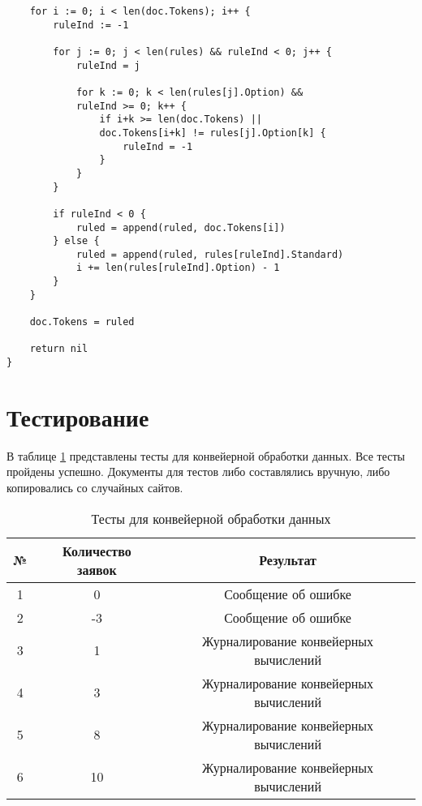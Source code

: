 \begin{code}
\caption{Листинг функции применения правил к токенам (окончание листинга \ref{code:rule1})}
\label{code:rule2}
\begin{verbatim}
	for i := 0; i < len(doc.Tokens); i++ {
		ruleInd := -1

		for j := 0; j < len(rules) && ruleInd < 0; j++ {
			ruleInd = j

			for k := 0; k < len(rules[j].Option) &&
			ruleInd >= 0; k++ {
				if i+k >= len(doc.Tokens) ||
				doc.Tokens[i+k] != rules[j].Option[k] {
					ruleInd = -1
				}
			}
		}

		if ruleInd < 0 {
			ruled = append(ruled, doc.Tokens[i])
		} else {
			ruled = append(ruled, rules[ruleInd].Standard)
			i += len(rules[ruleInd].Option) - 1
		}
	}

	doc.Tokens = ruled

	return nil
}
\end{verbatim}
\end{code}

\newpage

\section{Тестирование}
В таблице \ref{table:tests} представлены тесты для конвейерной обработки данных. Все тесты пройдены успешно. Документы для тестов либо составлялись вручную, либо копировались со случайных сайтов.

\begin{table}[H]
  \caption{\label{table:tests} Тесты для конвейерной обработки данных}
  \begin{center}
    \begin{tabular}{|c|c|c|}
      \hline
      № &  Количество заявок & Результат \\ \hline
      1 & 0 & Сообщение об ошибке \\ \hline
      2 & -3 & Сообщение об ошибке \\ \hline
      3 & 1 & Журналирование конвейерных вычислений \\ \hline
      4 & 3 & Журналирование конвейерных вычислений  \\ \hline
      5 & 8 & Журналирование конвейерных вычислений\\ \hline
      6 & 10 & Журналирование конвейерных вычислений \\ \hline
    \end{tabular}
  \end{center}
\end{table}

\newpage